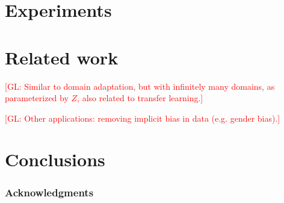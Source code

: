 \documentclass{article}
\newcommand{\glnote}[1]{\textcolor{red}{[GL: #1]}}
\theoremstyle{plain}
\begin{document}

\section{Experiments}



\section{Related work}

\glnote{Similar to domain adaptation, but with infinitely many domains,
as parameterized by $Z$, also related to transfer learning.}

\glnote{Other applications: removing implicit bias in data (e.g. gender bias).}



\section{Conclusions}



\subsubsection*{Acknowledgments}



\end{document}
